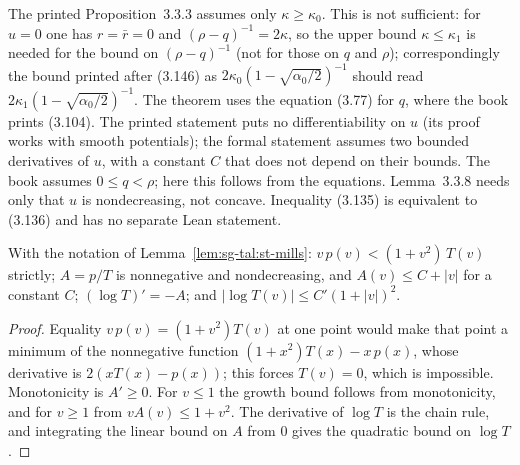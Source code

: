 \begin{remark}\label{rem:sg-tal:st-section33-bounds}
The printed Proposition~3.3.3 assumes only $\kappa\ge\kappa_0$. This is not sufficient: for $u=0$ one has
$r=\bar r=0$ and $(\rho-q)^{-1}=2\kappa$, so the upper bound $\kappa\le\kappa_1$ is needed for the bound on
$(\rho-q)^{-1}$ (not for those on $q$ and $\rho$); correspondingly the
bound printed after (3.146) as $2\kappa_0(1-\sqrt{\alpha_0/2})^{-1}$ should read
$2\kappa_1(1-\sqrt{\alpha_0/2})^{-1}$. The theorem uses the equation (3.77) for $q$, where the book prints
(3.104). The printed statement puts no differentiability on $u$ (its proof works with smooth potentials); the
formal statement assumes two bounded derivatives of $u$, with a constant $C$ that does not depend on their
bounds. The book assumes $0\le q<\rho$; here this follows from the equations. Lemma~3.3.8 needs
only that $u$ is nondecreasing, not concave. Inequality (3.135) is equivalent to (3.136) and has no separate
Lean statement.
\end{remark}

\begin{lemma}\label{lem:sg-tal:st-mills-growth}
  \leanok
With the notation of Lemma~\ref{lem:sg-tal:st-mills}: $v\,p(v)<(1+v^2)\,T(v)$ strictly; $A=p/T$ is nonnegative
and nondecreasing, and $A(v)\le C+|v|$ for a constant $C$; $(\log T)'=-A$; and $|\log T(v)|\le C'(1+|v|)^2$.
\end{lemma}
\begin{proof}
  \leanok
Equality $v\,p(v)=(1+v^2)T(v)$ at one point would make that point a minimum of the nonnegative function
$(1+x^2)T(x)-x\,p(x)$, whose derivative is $2(xT(x)-p(x))$; this forces $T(v)=0$, which is impossible.
Monotonicity is $A'\ge0$. For $v\le1$ the growth bound follows from monotonicity, and for $v\ge1$ from
$vA(v)\le1+v^2$. The derivative of $\log T$ is the chain rule, and integrating the linear bound on $A$ from $0$
gives the quadratic bound on $\log T$.
\end{proof}

